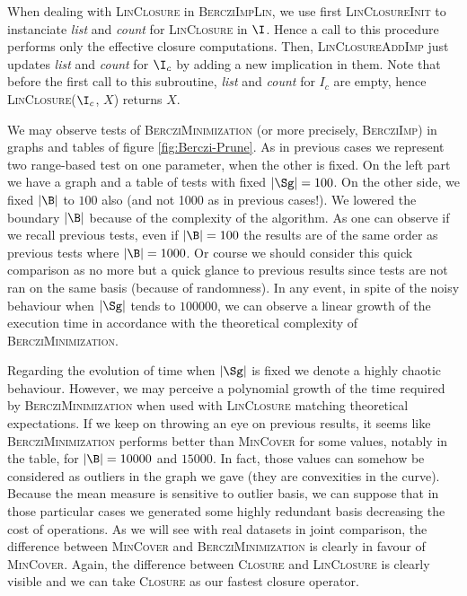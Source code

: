 When dealing with \textsc{LinClosure} in \textsc{BercziImpLin}, we use first \textsc{LinClosureInit} to instanciate 
\textit{list} and \textit{count} for \textsc{LinClosure} in $\I$. Hence a call
to this procedure performs only the effective closure computations. Then, 
\textsc{LinClosureAddImp} just updates \textit{list} and \textit{count} for $\I_c$ by adding a new implication in them. Note that before the first call to
this subroutine, \textit{list} and \textit{count} for $I_c$ are empty, hence
\textsc{LinClosure}($\I_c$, $X$) returns $X$.

\vspace{1.2em}

We may observe tests of \textsc{BercziMinimization} (or more precisely, \textsc{BercziImp}) in graphs and tables of figure \ref{fig:Berczi-Prune}. As in previous cases we represent two range-based test on one parameter, when the other is fixed. On the left part we have a graph and a table of tests with fixed $|\Sg| = 100$. On the other side, we fixed $|\B|$ to $100$ also (and not 1000 as in previous cases!). We lowered the boundary $|\B|$ because of the complexity of the algorithm. As one can observe if we recall previous tests, even if $|\B| = 100$ the results are of the same order as previous tests where $|\B| = 1000$. Or course we should consider this quick comparison as no more but a quick glance to previous results since tests are not ran on the same basis (because of randomness). In any event, in spite of the noisy behaviour when $|\Sg|$ tends to $100000$, we can observe a linear growth of the execution time in accordance with the theoretical complexity of \textsc{BercziMinimization}.

\newpage

\begin{figure}[ht!]
	
\end{figure}

\newpage

\vspace{1.2em}

Regarding the evolution of time when $|\Sg|$ is fixed we denote a highly chaotic
behaviour. However, we may perceive a polynomial growth of the time required by
\textsc{BercziMinimization} when used with \textsc{LinClosure} matching theoretical expectations. If we keep on throwing an eye on previous results,
it seems like \textsc{BercziMinimization} performs better than \textsc{MinCover}
for some values, notably in the table, for $|\B| = 10000$ and $15000$. In fact,
those values can somehow be considered as outliers in the graph we gave (they are convexities in the curve). Because the mean measure is sensitive to outlier
basis, we can suppose that in those particular cases we generated some highly redundant basis decreasing the cost of operations. As we will see with real datasets in joint comparison, the difference between \textsc{MinCover} and \textsc{BercziMinimization} is clearly in favour of \textsc{MinCover}. Again, the difference between \textsc{Closure} and \textsc{LinClosure} is clearly visible and we can take \textsc{Closure} as our fastest closure operator.

